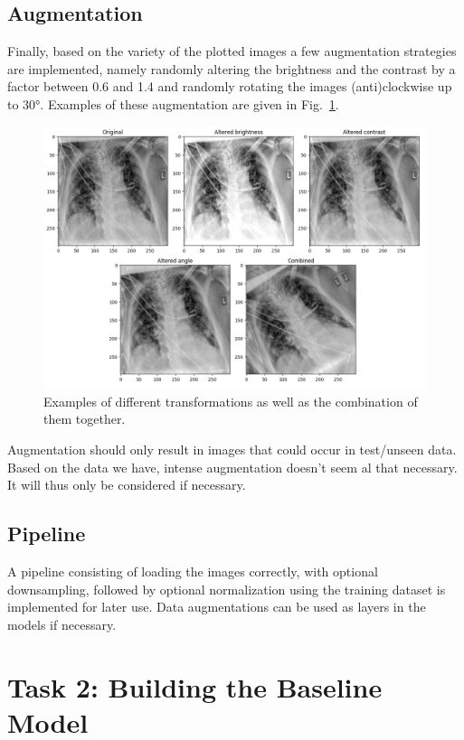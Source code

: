 \documentclass[conference]{IEEEtran}
\begin{document}
\subsection{Augmentation}
Finally, based on the variety of the plotted images a few augmentation strategies are implemented, namely randomly altering the brightness and the contrast by a factor between 0.6 and 1.4 and randomly rotating the images (anti)clockwise up to 30°. Examples of these augmentation are given in Fig.~\ref{fig:augmentation}.

\begin{figure}[htbp]
\centerline{\includegraphics[width=\linewidth]{Images/augmentation.png}}
\caption{Examples of different transformations as well as the combination of them together.}
\label{fig:augmentation}
\end{figure}

Augmentation should only result in images that could occur in test/unseen data. Based on the data we have, intense augmentation doesn't seem al that necessary. It will thus only be considered if necessary.

\subsection{Pipeline}
A pipeline consisting of loading the images correctly, with optional downsampling, followed by optional normalization using the training dataset is implemented for later use. Data augmentations can be used as layers in the models if necessary.








\section{Task 2: Building the Baseline Model}\label{sec:task_2}
\end{document}
